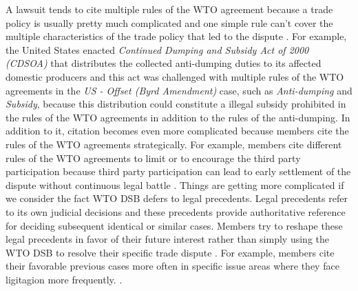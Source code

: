 A lawsuit tends to cite multiple rules of the WTO agreement because a trade policy is usually pretty much complicated
and one simple rule can't cover the multiple characteristics of the trade policy that led to the dispute \citep{palmeter2004dispute}.
For example, the United States enacted \textit{Continued Dumping and Subsidy Act of 2000 (CDSOA)} that distributes
the collected anti-dumping duties to its affected domestic producers and this act was challenged with multiple rules of the WTO agreements in the \textit{US - Offset (Byrd Amendment)} case,
such as \textit{Anti-dumping} and \textit{Subsidy}, because
this distribution could constitute a illegal subsidy prohibited
in the rules of the WTO agreements in addition to the rules of the anti-dumping. %
In addition to it, citation becomes even more complicated because members cite the
rules of the WTO agreements strategically. For example,
members cite different rules of the WTO agreements to limit or to encourage
the third party participation because third party
participation can lead to early settlement of the dispute without continuous
legal battle %
\citep{who_gets}.
Things are getting more complicated
if we consider the fact WTO DSB defers to legal precedents.
Legal precedents refer to its own judicial decisions
and these precedents provide authoritative reference
for deciding subsequent identical or similar cases.
Members try to reshape these legal precedents
in favor of their future interest rather than
simply using the WTO DSB to resolve their specific trade
dispute \citep{pelc}. For example,
members cite their
favorable previous cases more often in specific
issue areas where they face ligitagion more frequently. %
\citep{latent}.
 

